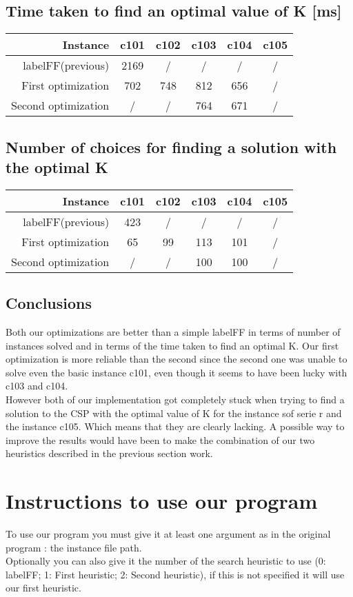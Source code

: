 \documentclass{eplDoc}
\begin{document}
\subsection{Time taken to find an optimal value of K [ms]}
\begin{tabular}{|r|c|c|c|c|c|}
	\hline
	Instance            & c101  & c102 & c103 & c104 & c105 \\   
	\hline
	labelFF(previous)  &  2169   &   / & /  &  / &   /  \\
	First optimization  &  702  &   748&  812 &   656&  /   \\
	Second optimization &   /   &   /  & 764  &  671 &  /   \\
	\hline
\end{tabular}
\subsection{Number of choices for finding a solution with the optimal K}
\begin{tabular}{|r|c|c|c|c|c|}
	\hline
	Instance            & c101  & c102 & c103 & c104 & c105 \\   
	\hline
	labelFF(previous)  &  423   &   / & /  &  / &   /  \\
	First optimization  &  65   &   99 & 113  &  101 &   /  \\
	Second optimization &   /   &   /  & 100  &  100 &   /  \\
	\hline
\end{tabular}

\subsection{Conclusions}
Both our optimizations are better than a simple labelFF in terms of number of instances solved and in terms of the time taken to find an optimal K. Our first optimization is more reliable than the second since the second one was unable to solve even the basic instance c101, even though it seems to have been lucky with c103 and c104.  \\ 
However both of our implementation got completely stuck when trying to find a solution to the CSP with the optimal value of K for the instance sof serie r and the instance c105. Which means that they are clearly lacking. A possible way to improve the results would have been to make the combination of our two heuristics described in the previous section work. 


\section{Instructions to use our program}
To use our program you must give it at least one argument as in the original program : the instance file path. \\ 
Optionally you can also give it the number of the search heuristic to use (0: labelFF; 1: First heuristic; 2: Second heuristic), if this is not specified it will use our first heuristic. 
\end{document}
